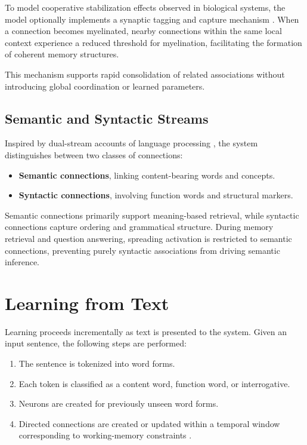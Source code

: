 \documentclass[11pt]{article}
\begin{document}
To model cooperative stabilization effects observed in biological systems,
the model optionally implements a synaptic tagging and capture mechanism \citep{frey1997synaptic}.
When a connection becomes myelinated, nearby connections within the same local
context experience a reduced threshold for myelination, facilitating the formation
of coherent memory structures.

This mechanism supports rapid consolidation of related associations without
introducing global coordination or learned parameters.

\subsection{Semantic and Syntactic Streams}

Inspired by dual-stream accounts of language processing \citep{saur2008ventral},
the system distinguishes between two classes of connections:

\begin{itemize}
\item \textbf{Semantic connections}, linking content-bearing words and concepts.
\item \textbf{Syntactic connections}, involving function words and structural markers.
\end{itemize}

Semantic connections primarily support meaning-based retrieval, while syntactic
connections capture ordering and grammatical structure.
During memory retrieval and question answering, spreading activation is restricted
to semantic connections, preventing purely syntactic associations from driving
semantic inference.

\section{Learning from Text}

Learning proceeds incrementally as text is presented to the system.
Given an input sentence, the following steps are performed:

\begin{enumerate}
\item The sentence is tokenized into word forms.
\item Each token is classified as a content word, function word, or interrogative.
\item Neurons are created for previously unseen word forms.
\item Directed connections are created or updated within a temporal window
      corresponding to working-memory constraints \citep{miller1956magical}.
\end{enumerate}
\end{document}
